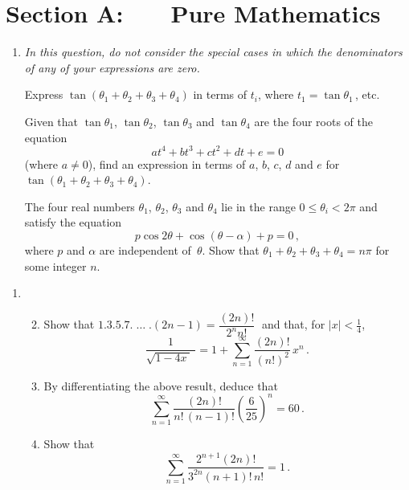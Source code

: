 \documentclass[a4, 11pt]{report}
\newlength{\qspace}
\newcounter{qnumber}
\newenvironment{question}%
 {\vspace{\qspace}
  \begin{enumerate}[\bfseries 1\quad][10]%
    \setcounter{enumi}{\value{qnumber}}%
    \item%
 }
{
  \end{enumerate}
  \filbreak
  \stepcounter{qnumber}
 }
\newenvironment{questionparts}[1][1]%
 {
  \begin{enumerate}[\bfseries (i)]%
    \setcounter{enumii}{#1}
    \addtocounter{enumii}{-1}
    \setlength{\itemsep}{5mm}
    \setlength{\parskip}{8pt}
 }
 {
  \end{enumerate}
 }
\def\le{\leqslant}
\begin{document}
\setcounter{page}{2}

 
\section*{Section A: \ \ \ Pure Mathematics}

\begin{question}
{\sl In this question, 
do not consider the special cases in which the denominators
of any of your expressions are zero.}

Express $\tan(\theta_1+\theta_2+\theta_3+\theta_4)$ in terms 
of $t_i$, where  $t_1=\tan\theta_1\,$, etc.

Given that $\tan\theta_1$, $\tan\theta_2$, $\tan\theta_3$ and $\tan\theta_4$ 
are the four roots
of the equation \[at^4+bt^3+ct^2+dt+e=0
\]
(where $a\ne0$), find an expression in terms
of $a$, $b$, $c$,  $d$ and $e$ for
$\tan(\theta_1+\theta_2+\theta_3+\theta_4)$.

The four real numbers  $\theta_1$, $\theta_2$, $\theta_3$ and $\theta_4$
lie in the range $0\le \theta_i<2\pi$ and satisfy
the  equation 
\[
p\cos2\theta+\cos(\theta-\alpha)+p=0\,,\]
where $p$  and 
$\alpha$ are independent of~$\theta$. 
Show that
$\theta_1+\theta_2+\theta_3+\theta_4=n\pi$ for some integer $n$.
\end{question}

\begin{question}
\begin{questionparts}
\item Show that $1.3.5.7. \;\ldots \;.(2n-1)=\dfrac {(2n)!}{2^n n!}\;$
and  that, for $\vert x \vert
  < \frac14$,
\[
\frac{1}{\sqrt{1-4x\;}\;}
=1+\sum_{n=1}^\infty \frac {(2n)!}{(n!)^2} \, x^n \,.
\]

\item By differentiating the above result, deduce that 
\[
\sum _{n=1}^\infty \frac{(2n)!}{n!\,(n-1)!} 
\left(\frac6{25}\right)^{\!\!n} = 
60
\,.
\]

\item Show that 
\[
\sum _{n=1}^\infty \frac{2^{n+1}(2n)!}{3^{2n}(n+1)!\,n!} 
 = 
1
\,.
\]

\end{questionparts}
\end{question}
\end{document}
